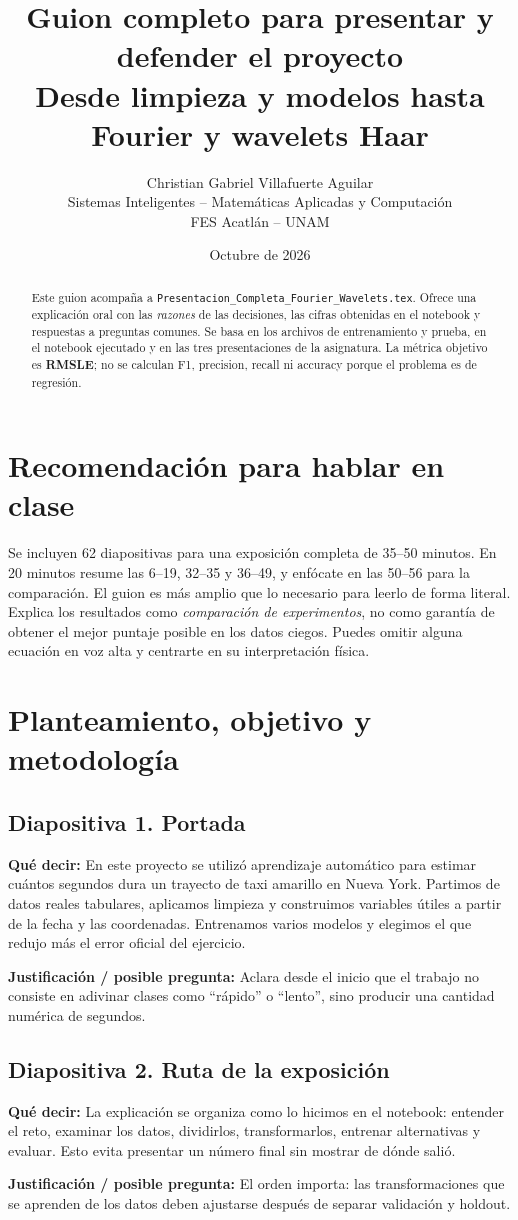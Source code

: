 \documentclass[11pt,letterpaper]{article}
\title{Guion completo para presentar y defender el proyecto\\[3mm]\large Desde limpieza y modelos hasta Fourier y wavelets Haar}
\author{Christian Gabriel Villafuerte Aguilar\\Sistemas Inteligentes -- Matemáticas Aplicadas y Computación\\FES Acatlán -- UNAM}
\date{Octubre de 2026}
\newcommand{\lamina}[2]{\subsection*{Diapositiva #1. #2}}
\newcommand{\explica}[1]{\noindent\textcolor{azul}{\textbf{Qué decir:}} #1\par\smallskip}
\newcommand{\defiende}[1]{\noindent\textcolor{verde}{\textbf{Justificación / posible pregunta:}} #1\par\medskip}
\begin{document}
\maketitle
\begin{abstract}
Este guion acompaña a \texttt{Presentacion\_Completa\_Fourier\_Wavelets.tex}. Ofrece una explicación oral con las \emph{razones} de las decisiones, las cifras obtenidas en el notebook y respuestas a preguntas comunes. Se basa en los archivos de entrenamiento y prueba, en el notebook ejecutado y en las tres presentaciones de la asignatura. La métrica objetivo es \textbf{RMSLE}; no se calculan F1, precision, recall ni accuracy porque el problema es de regresión.
\end{abstract}

\section*{Recomendación para hablar en clase}
Se incluyen 62 diapositivas para una exposición completa de 35--50 minutos. En 20 minutos resume las 6--19, 32--35 y 36--49, y enfócate en las 50--56 para la comparación. El guion es más amplio que lo necesario para leerlo de forma literal. Explica los resultados como \emph{comparación de experimentos}, no como garantía de obtener el mejor puntaje posible en los datos ciegos. Puedes omitir alguna ecuación en voz alta y centrarte en su interpretación física.

\section{Planteamiento, objetivo y metodología}
\lamina{1}{Portada}
\explica{En este proyecto se utilizó aprendizaje automático para estimar cuántos segundos dura un trayecto de taxi amarillo en Nueva York. Partimos de datos reales tabulares, aplicamos limpieza y construimos variables útiles a partir de la fecha y las coordenadas. Entrenamos varios modelos y elegimos el que redujo más el error oficial del ejercicio.}
\defiende{Aclara desde el inicio que el trabajo no consiste en adivinar clases como ``rápido'' o ``lento'', sino producir una cantidad numérica de segundos.}

\lamina{2}{Ruta de la exposición}
\explica{La explicación se organiza como lo hicimos en el notebook: entender el reto, examinar los datos, dividirlos, transformarlos, entrenar alternativas y evaluar. Esto evita presentar un número final sin mostrar de dónde salió.}
\defiende{El orden importa: las transformaciones que se aprenden de los datos deben ajustarse después de separar validación y holdout.}
\end{document}
